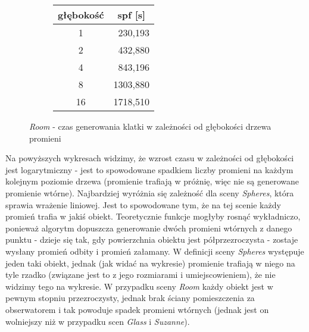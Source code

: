 \vspace*{-4mm}
\begin{figure}[H]
\begin{subfigure}{.5\textwidth}
\end{subfigure}
\begin{subfigure}{.5\textwidth}
		\caption{Tabla z wynikami}
		\begin{longtable}{|c|r|} \hline
	    głębokość & \multicolumn{1}{|c|}{spf [s]} \\ \hline
		1 & 230,193 \\
		2 & 432,880 \\
		4 & 843,196 \\ 
		8 & 1303,880 \\
		16 & 1718,510 \\
		\hline
		\end{longtable}
\end{subfigure}
\caption{\emph{Room} - czas generowania klatki w zależności od głębokości drzewa promieni}
\end{figure}

Na powyższych wykresach widzimy, że wzrost czasu w zależności od głębokości jest logarytmiczny - jest to spowodowane spadkiem liczby promieni na każdym kolejnym poziomie drzewa (promienie trafiają w próżnię, więc nie są generowane promienie wtórne). Najbardziej wyróżnia się zależność dla sceny \emph{Spheres}, która sprawia wrażenie liniowej. Jest to spowodowane tym, że na tej scenie każdy promień trafia w jakiś obiekt. Teoretycznie funkcje mogłyby rosnąć wykładniczo, ponieważ algorytm dopuszcza generowanie dwóch promieni wtórnych z danego punktu - dzieje się tak, gdy powierzchnia obiektu jest półprzezroczysta - zostaje wysłany promień odbity i promień załamany. W definicji sceny \emph{Spheres} występuje jeden taki obiekt, jednak (jak widać na wykresie) promienie trafiają w niego na tyle rzadko (związane jest to z jego rozmiarami i umiejscowieniem), że nie widzimy tego na wykresie. W przypadku sceny \emph{Room} każdy obiekt jest w pewnym stopniu przezroczysty, jednak brak ściany pomieszczenia za obserwatorem i tak powoduje spadek promieni wtórnych (jednak jest on wolniejszy niż w przypadku scen \emph{Glass} i \emph{Suzanne}).

